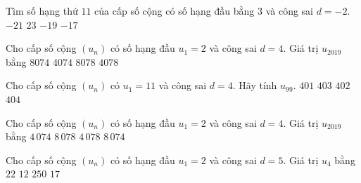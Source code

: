 

\begin{ex}%
	Tìm số hạng thứ $11$ của cấp số cộng có số hạng đầu bằng $3$ và công  sai $d=-2$.
	\choice 
		 {$-21$}
		 {$23$}
		 {$-19$}
		{\True $-17$} 
\end{ex}

\begin{ex}%
	 Cho cấp số cộng $(u_n)$ có số hạng đầu $u_1=2$ và công sai $d=4$. Giá trị $u_{2019}$ bằng
	\choice 
		 {\True $8074$}
		 {$4074$}
		 {$8078$}
		{$4078$} 
\end{ex}

\begin{ex}%
	Cho cấp số cộng $(u_n)$ có $u_1=11$ và  công sai $d=4$. Hãy tính $u_{99}$.
	 \choice
		 {$401$}
		{\True $403$} 
		{$402$} 
		 {$404$}
\end{ex}

\begin{ex}%
	Cho  cấp số cộng $(u_n)$ có số hạng đầu $u_1=2$ và công sai $d=4$. Giá trị $u_{2019}$ bằng
	\choice 
		 {$4\,074$}
		 {$8\,078$}
		 {$4\,078$}
		 {\True $8\,074$}
\end{ex}

\begin{ex}%
	Cho  cấp số cộng $(u_n)$ có số hạng đầu $u_1=2$ và công sai $d=5$. Giá trị $u_4$ bằng
	 \choice
		{$22$} 
		 {$12$}
		{$250$} 
		 {\True $17$}
\end{ex}

